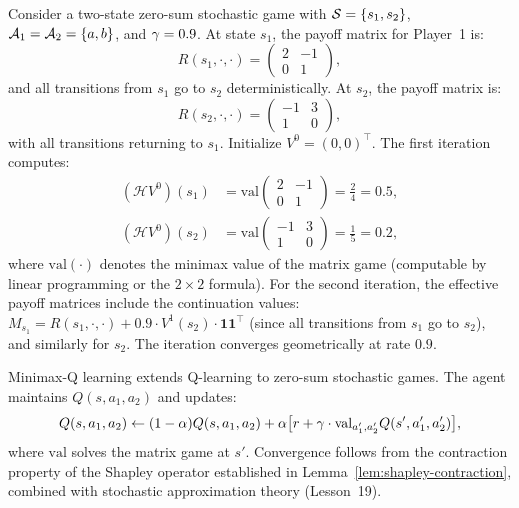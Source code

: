 \documentclass[11pt,a4paper]{article}
\begin{document}
\begin{example}
\label{ex:zs-vi}
Consider a two-state zero-sum stochastic game with $\mathcal{S} =
\{s_1, s_2\}$, $\mathcal{A}_1 = \mathcal{A}_2 = \{a, b\}$, and
$\gamma = 0.9$.  At state $s_1$, the payoff matrix for Player~1
is:
\begin{equation*}
  R(s_1, \cdot, \cdot) =
  \begin{pmatrix} 2 & -1 \\ 0 & 1 \end{pmatrix},
\end{equation*}
and all transitions from $s_1$ go to $s_2$ deterministically.  At
$s_2$, the payoff matrix is:
\begin{equation*}
  R(s_2, \cdot, \cdot) =
  \begin{pmatrix} -1 & 3 \\ 1 & 0 \end{pmatrix},
\end{equation*}
with all transitions returning to $s_1$.  Initialize $V^0 =
(0, 0)^{\top}$.  The first iteration computes:
\begin{align*}
  (\mathcal{H}V^0)(s_1)
  &= \text{val}\begin{pmatrix} 2 & -1 \\ 0 & 1 \end{pmatrix}
  = \frac{2}{4} = 0.5, \\
  (\mathcal{H}V^0)(s_2)
  &= \text{val}\begin{pmatrix} -1 & 3 \\ 1 & 0 \end{pmatrix}
  = \frac{1}{5} = 0.2,
\end{align*}
where $\text{val}(\cdot)$ denotes the minimax value of the matrix
game (computable by linear programming or the $2 \times 2$ formula).
For the second iteration, the effective payoff matrices include the
continuation values:
$M_{s_1} = R(s_1,\cdot,\cdot) + 0.9 \cdot V^1(s_2)
\cdot \mathbf{1}\mathbf{1}^\top$ (since all transitions from $s_1$
go to $s_2$), and similarly for $s_2$.  The iteration converges
geometrically at rate $0.9$.
\end{example}

\begin{rlconnection}[title={Minimax-Q Learning}]
Minimax-Q learning \citep{filar1997} extends Q-learning to zero-sum
stochastic games.  The agent maintains $Q(s, a_1, a_2)$ and updates:
\[
  Q(s,a_1,a_2) \leftarrow (1-\alpha) Q(s,a_1,a_2)
  + \alpha\bigl[r + \gamma \cdot
  \text{val}_{a_1',a_2'} Q(s', a_1', a_2')\bigr],
\]
where $\text{val}$ solves the matrix game at $s'$.  Convergence
follows from the contraction property of the Shapley operator
established in Lemma~\ref{lem:shapley-contraction}, combined with
stochastic approximation theory (Lesson~19).
\end{rlconnection}
\end{document}
